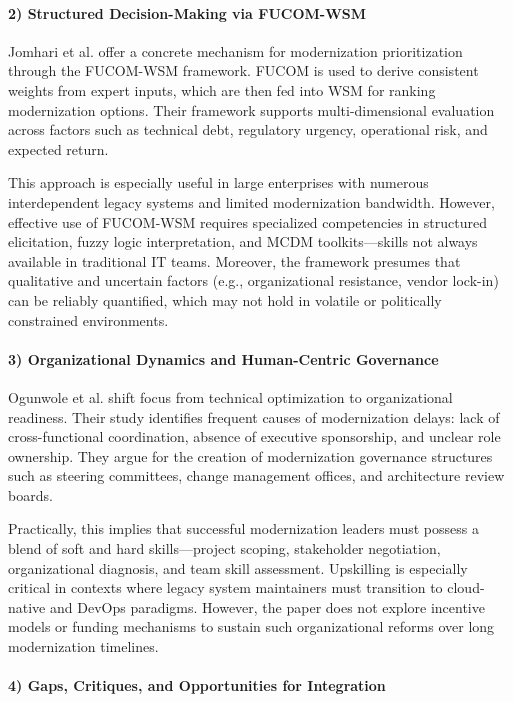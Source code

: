 \documentclass[12pt]{article}
\begin{document}
\paragraph{2) Structured Decision-Making via FUCOM-WSM}

Jomhari et al. \cite{jomhari2024} offer a concrete mechanism for modernization prioritization through the FUCOM-WSM framework. FUCOM is used to derive consistent weights from expert inputs, which are then fed into WSM for ranking modernization options. Their framework supports multi-dimensional evaluation across factors such as technical debt, regulatory urgency, operational risk, and expected return.

This approach is especially useful in large enterprises with numerous interdependent legacy systems and limited modernization bandwidth. However, effective use of FUCOM-WSM requires specialized competencies in structured elicitation, fuzzy logic interpretation, and MCDM toolkits—skills not always available in traditional IT teams. Moreover, the framework presumes that qualitative and uncertain factors (e.g., organizational resistance, vendor lock-in) can be reliably quantified, which may not hold in volatile or politically constrained environments.

\paragraph{3) Organizational Dynamics and Human-Centric Governance}

Ogunwole et al. \cite{ogunwole2023} shift focus from technical optimization to organizational readiness. Their study identifies frequent causes of modernization delays: lack of cross-functional coordination, absence of executive sponsorship, and unclear role ownership. They argue for the creation of modernization governance structures such as steering committees, change management offices, and architecture review boards.

Practically, this implies that successful modernization leaders must possess a blend of soft and hard skills—project scoping, stakeholder negotiation, organizational diagnosis, and team skill assessment. Upskilling is especially critical in contexts where legacy system maintainers must transition to cloud-native and DevOps paradigms. However, the paper does not explore incentive models or funding mechanisms to sustain such organizational reforms over long modernization timelines.

\paragraph{4) Gaps, Critiques, and Opportunities for Integration}
\end{document}

